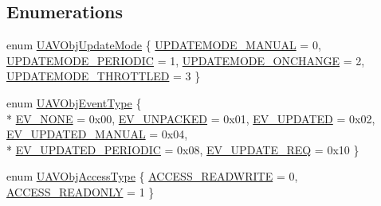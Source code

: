 \subsection*{Enumerations}
\begin{DoxyCompactItemize}
\item 
enum \hyperlink{group___u_a_v_gafd571f69747daf7681eb869270e27208}{U\-A\-V\-Obj\-Update\-Mode} \{ \hyperlink{group___u_a_v_ggafd571f69747daf7681eb869270e27208a12e805e1980a6c1db387c6dd64899211}{U\-P\-D\-A\-T\-E\-M\-O\-D\-E\-\_\-\-M\-A\-N\-U\-A\-L} = 0, 
\hyperlink{group___u_a_v_ggafd571f69747daf7681eb869270e27208af74249c30e59637ef72cb3e8bfa4f2e6}{U\-P\-D\-A\-T\-E\-M\-O\-D\-E\-\_\-\-P\-E\-R\-I\-O\-D\-I\-C} = 1, 
\hyperlink{group___u_a_v_ggafd571f69747daf7681eb869270e27208acbf36ecb56ab3709a62fc424e4572a12}{U\-P\-D\-A\-T\-E\-M\-O\-D\-E\-\_\-\-O\-N\-C\-H\-A\-N\-G\-E} = 2, 
\hyperlink{group___u_a_v_ggafd571f69747daf7681eb869270e27208a58214a235c70b2326a2ced4b4b35b8e1}{U\-P\-D\-A\-T\-E\-M\-O\-D\-E\-\_\-\-T\-H\-R\-O\-T\-T\-L\-E\-D} = 3
 \}
\item 
enum \hyperlink{group___u_a_v_ga34a55b89fda6526f21cfdcab529d0f99}{U\-A\-V\-Obj\-Event\-Type} \{ \\*
\hyperlink{group___u_a_v_gga34a55b89fda6526f21cfdcab529d0f99aed55dd6c8ee040c948acb2c7cfad9b5e}{E\-V\-\_\-\-N\-O\-N\-E} = 0x00, 
\hyperlink{group___u_a_v_gga34a55b89fda6526f21cfdcab529d0f99afae66e39228b8c5149ce5e1c4ec971e7}{E\-V\-\_\-\-U\-N\-P\-A\-C\-K\-E\-D} = 0x01, 
\hyperlink{group___u_a_v_gga34a55b89fda6526f21cfdcab529d0f99acdf8aece25d551af624414ce164e7a7e}{E\-V\-\_\-\-U\-P\-D\-A\-T\-E\-D} = 0x02, 
\hyperlink{group___u_a_v_gga34a55b89fda6526f21cfdcab529d0f99a891a979761ba03c0e1acbc14e19913d3}{E\-V\-\_\-\-U\-P\-D\-A\-T\-E\-D\-\_\-\-M\-A\-N\-U\-A\-L} = 0x04, 
\\*
\hyperlink{group___u_a_v_gga34a55b89fda6526f21cfdcab529d0f99ae8feac7890d0b7768f94787ec9393abf}{E\-V\-\_\-\-U\-P\-D\-A\-T\-E\-D\-\_\-\-P\-E\-R\-I\-O\-D\-I\-C} = 0x08, 
\hyperlink{group___u_a_v_gga34a55b89fda6526f21cfdcab529d0f99a19edb0a4a5486ca878a6baf0fb4b809b}{E\-V\-\_\-\-U\-P\-D\-A\-T\-E\-\_\-\-R\-E\-Q} = 0x10
 \}
\item 
enum \hyperlink{group___u_a_v_ga04b37fd239d7727a21668d35d11ad7df}{U\-A\-V\-Obj\-Access\-Type} \{ \hyperlink{group___u_a_v_gga04b37fd239d7727a21668d35d11ad7dfadeb231224503f8c63c221877b388fbe1}{A\-C\-C\-E\-S\-S\-\_\-\-R\-E\-A\-D\-W\-R\-I\-T\-E} = 0, 
\hyperlink{group___u_a_v_gga04b37fd239d7727a21668d35d11ad7dfa88d5dcaffa414c5fe3e778789366bad3}{A\-C\-C\-E\-S\-S\-\_\-\-R\-E\-A\-D\-O\-N\-L\-Y} = 1
 \}
\end{DoxyCompactItemize}
